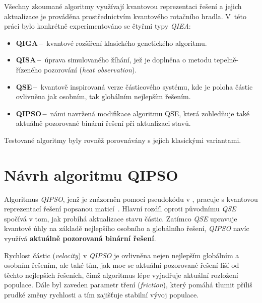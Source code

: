 \documentclass[czech]{ExcelAtFIT} %
\begin{document}
Všechny zkoumané algoritmy využívají kvantovou reprezentaci řešení a jejich aktualizace je prováděna prostřednictvím kvantového rotačního hradla.
V~této práci bylo konkrétně experimentováno se čtyřmi typy \emph{QIEA}:
\begin{itemize}
	\item \textbf{QIGA\,--\,} kvantové rozšíření klasického genetického algoritmu.
	\item \textbf{QISA\,--\,} úprava simulovaného žíhání, jež je doplněna o metodu tepelně-řízeného pozorování (\emph{heat observation}).
	\item \textbf{QSE\,--\,} kvantově inspirovaná verze částicového systému, kde je poloha částic ovlivněna jak osobním, tak globálním nejlepším řešením.
	\item \textbf{QIPSO\,--\,} námi navržená modifikace algoritmu QSE, která zohledňuje také aktuálně pozorované binární řešení při aktualizaci stavů.
\end{itemize}
Testované algoritmy byly rovněž porovnávány s jejich klasickými variantami.

\section{Návrh algoritmu QIPSO}
Algoritmus \emph{QIPSO}, jenž je znázorněn pomocí pseudokódu v , pracuje s kvantovou reprezentací řešení popsanou maticí~.
Hlavní rozdíl oproti původnímu \emph{QSE} spočívá v tom, jak probíhá aktualizace stavu částic. 
Zatímco \emph{QSE} upravuje kvantové úhly na základě nejlepšího osobního a globálního řešení, \emph{QIPSO} navíc využívá \textbf{aktuálně pozorovaná binární řešení}. 

Rychlost částic (\emph{velocity}) v \emph{QIPSO} je ovlivněna nejen nejlepším globálním a osobním řešením, ale také tím, jak moc se aktuální pozorované řešení liší od těchto nejlepších řešeních, čímž algoritmus lépe vyjadřuje aktuální rozložení populace. 
Dále byl zaveden parametr tření (\emph{friction}), který pomáhá tlumit příliš prudké změny rychlosti a tím zajišťuje stabilní vývoj populace. 

\end{document}
